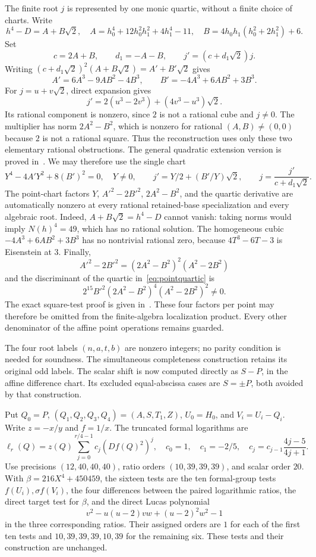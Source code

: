 \documentclass[11pt,a4paper]{article}
\begin{document}
The finite root $j$ is represented by one monic quartic,
without a finite choice of charts. Write
\[
 h^4-D=A+B\sqrt2,
 \quad A=h_0^4+12h_0^2h_1^2+4h_1^4-11,
 \quad B=4h_0h_1(h_0^2+2h_1^2)+6.
\]
Set
\[
 c=2A+B,\qquad d_1=-A-B,\qquad j'=(c+d_1\sqrt2)j.
\]
Writing $(c+d_1\sqrt2)^2(A+B\sqrt2)=A'+B'\sqrt2$ gives
\[
 A'=6A^3-9AB^2-4B^3,\qquad
 B'=-4A^3+6AB^2+3B^3.
\]
For $j=u+v\sqrt2$, direct expansion gives
\[
 j'=2(u^3-2v^3)+(4v^3-u^3)\sqrt2.
\]
Its rational component is nonzero, since $2$ is not a rational
cube and $j\ne0$. The multiplier has norm $2A^2-B^2$,
which is nonzero for rational $(A,B)\ne(0,0)$ because $2$
is not a rational square. Thus the reconstruction uses only
these two elementary rational obstructions. The general quadratic
extension version is proved in~\cite{QuadraticCharts}.
We may therefore use the single chart
\begin{equation}\label{eq:pointquartic}
 Y^4-4A'Y^2+8(B')^2=0,\quad Y\ne0,\qquad
 j'=Y/2+(B'/Y)\sqrt2,\qquad
 j=\frac{j'}{c+d_1\sqrt2}.
\end{equation}
The point-chart factors $Y$, $A'^2-2B'^2$, $2A^2-B^2$,
and the quartic derivative are automatically nonzero at every
rational retained-base specialization and every algebraic root.
Indeed, $A+B\sqrt2=h^4-D$ cannot vanish: taking norms would
imply $N(h)^4=49$, which has no rational solution. The homogeneous cubic
$-4A^3+6AB^2+3B^3$ has no nontrivial rational zero, because
$4T^3-6T-3$ is Eisenstein at $3$. Finally,
\[
 A'^2-2B'^2=(2A^2-B^2)^2(A^2-2B^2)
\]
and the discriminant of the quartic in~\eqref{eq:pointquartic} is
\[
                 2^{15}B'^2(2A^2-B^2)^4(A^2-2B^2)^2\ne0.
\]
The exact square-test proof is given in~\cite{SquarePredicate}.
These four factors per point may therefore be omitted from the
finite-algebra localization product. Every other denominator of the
affine point operations remains guarded.

The four root labels $(n,a,t,b)$ are nonzero integers; no parity
condition is needed for soundness. The simultaneous completeness
construction retains its original odd labels. The scalar shift
is now computed directly as $S-P$, in the affine difference
chart. Its excluded equal-abscissa cases are $S=\pm P$, both
avoided by that construction.

Put $Q_0=P$, $(Q_1,Q_2,Q_3,Q_4)=(A,S,T_1,Z)$,
$U_0=H_0$, and $V_i=U_i-Q_i$. Write $z=-x/y$ and $f=1/x$.
The truncated formal logarithms are
\[
 \ell_r(Q)=z(Q)\sum_{j=0}^{r/4-1}c_j(Df(Q)^2)^j,
 \quad c_0=1,\quad c_1=-2/5,\quad
 c_j=c_{j-1}\frac{4j-5}{4j+1}.
\]
Use precisions $(12,40,40,40)$, ratio orders $(10,39,39,39)$,
and scalar order $20$. With
$\beta=216X^4+450459$, the sixteen tests are the ten
formal-group tests $f(U_i),\sigma f(V_i)$, the four differences
between the paired logarithmic ratios, the direct target test
for $\beta$, and the direct Lucas polynomial
\[
 v^2-u(u-2)vw+(u-2)^2w^2-1
\]
in the three corresponding ratios. Their assigned orders are
$1$ for each of the first ten tests and
$10,39,39,39,10,39$ for the remaining six. These tests and
their construction are unchanged.
\end{document}
